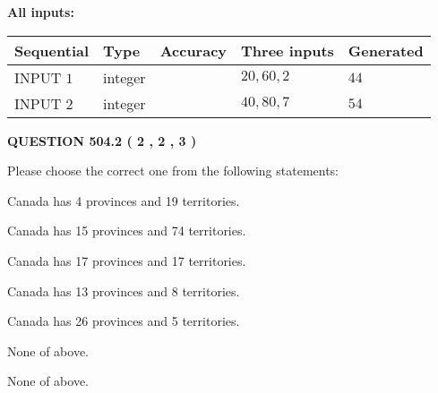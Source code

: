 \documentclass[12pt]{article}
\begin{document}
   
   
   
\noindent{}
   
   
   
   
\noindent\vspace{0.1in}\hspace{-0.08in} {\textbf{\Large{All inputs: }}}
   
   
  
  
\noindent\begin{tabular}{|l|l|l|l|l|}
\hline
 Sequential & Type & Accuracy & Three inputs & Generated \\ 
\hline
 
 
  INPUT $  1 $ & integer &  & $
 20
 , 
 60
 , 
 2
 $ & $ 44 $ 
 \\  \hline  
 
 
  INPUT $  2 $ & integer &  & $
 40
 , 
 80
 , 
 7
 $ & $ 54 $ 
 \\  \hline  
 \end{tabular}
   
   
  
\vspace{0.2in}
  
{\textbf{\Large{QUESTION
504.2 
 ( 2 , 2 , 3 )
}}}
  
  
Please choose the correct one from the following statements:
 
 
Canada has   4 provinces and  19 territories.
 
 
Canada has  15 provinces and  74 territories.
 
 
Canada has  17 provinces and  17 territories.
 
 
Canada has  13 provinces and  8 territories.
 
 
Canada has  26 provinces and  5 territories.
 
 
 None of above.
 
 
\noindent{}
 
 
 None of above.
 
 
\noindent{}
 
 
   
   
   
\end{document}
